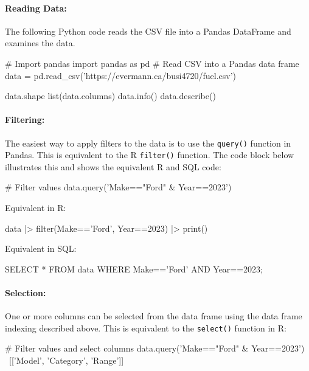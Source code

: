 \begin{samepage}
\paragraph*{Reading Data:} The following Python code reads the CSV file into a Pandas DataFrame and examines the data.

\begin{pythoncode}
# Import pandas 
import pandas as pd
# Read CSV into a Pandas data frame
data = pd.read_csv('https://evermann.ca/busi4720/fuel.csv')

data.shape
list(data.columns)
data.info()
data.describe()
\end{pythoncode}
\end{samepage}

\paragraph*{Filtering:} The easiest way to apply filters to the data is to use the \texttt{query()} function in Pandas. This is equivalent to the R \texttt{filter()} function. The code block below illustrates this and shows the equivalent R and SQL code:

\begin{samepage}
\begin{pythoncode}
# Filter values
data.query('Make=="Ford" & Year==2023')
\end{pythoncode}

\begin{multicols}{2}
Equivalent in R:
\begin{Rcode}
data |> 
  filter(Make=='Ford', 
         Year==2023) |> 
  print()
\end{Rcode}

Equivalent in SQL:
\begin{sqlcode}
SELECT * 
   FROM data 
   WHERE Make=='Ford' AND 
         Year==2023;
\end{sqlcode}
\end{multicols}
\end{samepage}

\paragraph*{Selection:} One or more columns can be selected from the data frame using the data frame indexing described above. This is equivalent to the \texttt{select()} function in R:

\begin{samepage}
\begin{pythoncode}
# Filter values and select columns
data.query('Make=="Ford" & Year==2023') \
    [['Model', 'Category', 'Range']]
\end{pythoncode}
\end{samepage}

